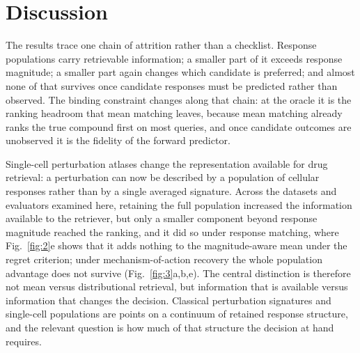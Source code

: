 \documentclass[11pt,letterpaper]{article}
\begin{document}
\section*{Discussion}

The results trace one chain of attrition rather than a checklist. Response populations carry retrievable information; a smaller part of it exceeds response magnitude; a smaller part again changes which candidate is preferred; and almost none of that survives once candidate responses must be predicted rather than observed. The binding constraint changes along that chain: at the oracle it is the ranking headroom that mean matching leaves, because mean matching already ranks the true compound first on most queries, and once candidate outcomes are unobserved it is the fidelity of the forward predictor.

Single-cell perturbation atlases\cite{ref3,dataSciPlex3,Tahoe100M} change the representation available for drug retrieval: a perturbation can now be described by a population of cellular responses rather than by a single averaged signature. Across the datasets and evaluators examined here, retaining the full population increased the information available to the retriever, but only a smaller component beyond response magnitude reached the ranking, and it did so under response matching, where Fig.~\ref{fig:2}e shows that it adds nothing to the magnitude-aware mean under the regret criterion; under mechanism-of-action recovery the whole population advantage does not survive (Fig.~\ref{fig:3}a,b,e). The central distinction is therefore not mean versus distributional retrieval, but information that is available versus information that changes the decision. Classical perturbation signatures and single-cell populations are points on a continuum of retained response structure, and the relevant question is how much of that structure the decision at hand requires.
\end{document}
